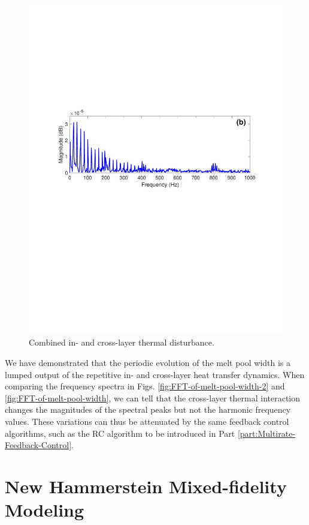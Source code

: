 \documentclass [11pt, proquest] {uwthesis}[2020/02/24]
\begin{document}
\begin{figure}[!ht]
\begin{centering}
{\begin{centering}
\includegraphics[clip,width=12cm]{Closed-loop-simulation/crosslayer_1200K}
\par\end{centering}
}
\par\end{centering}
\centering{}\caption{\label{fig:In-cross-layer-melt-pool}Combined in- and cross-layer
thermal disturbance. }
\end{figure}
We have demonstrated that the periodic evolution of the melt pool
width is a lumped output of the repetitive in- and cross-layer heat
transfer dynamics. When comparing the frequency spectra in Figs. \ref{fig:FFT-of-melt-pool-width-2}
and \ref{fig:FFT-of-melt-pool-width}, we can tell that the cross-layer
thermal interaction changes the magnitudes of the spectral peaks but
not the harmonic frequency values. These variations can thus be attenuated
by the same feedback control algorithms, such as the RC algorithm
to be introduced in Part \ref{part:Multirate-Feedback-Control}.



\chapter{New Hammerstein Mixed-fidelity Modeling} \label{chap:New-Hammerstein-Modeling}
\end{document}
